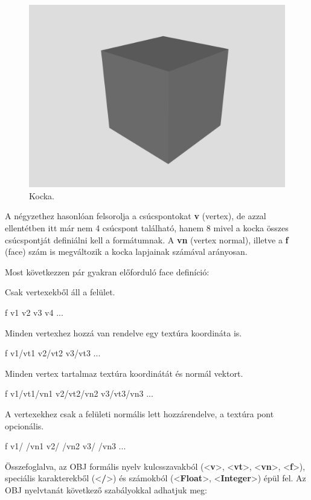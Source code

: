 \begin{figure}[h]
\centering
\includegraphics[scale=0.23]{images/cube_notexture.png}
\caption{Kocka.}
\end{figure}

A négyzethez hasonlóan felsorolja a csúcspontokat \textbf{v} (vertex), de azzal ellentétben itt már nem 4 csúcspont található, hanem 8 mivel a kocka összes csúcspontját definiálni kell a formátumnak. A \textbf{vn} (vertex normal), illetve a \textbf{f} (face) szám is megváltozik a kocka lapjainak számával arányosan.\newline


\noindent Most következzen pár gyakran előforduló face definíció:\newline

\noindent Csak vertexekből áll a felület.
\begin{cpp} 
f v1 v2 v3 v4 ...
\end{cpp}
Minden vertexhez hozzá van rendelve egy textúra koordináta is.
\begin{cpp} 
f v1/vt1 v2/vt2 v3/vt3 ...
\end{cpp}
Minden vertex tartalmaz textúra koordinátát és normál vektort.
\begin{cpp} 
f v1/vt1/vn1 v2/vt2/vn2 v3/vt3/vn3 ...
\end{cpp}
A vertexekhez csak a felületi normális lett hozzárendelve, a textúra pont opcionális.
\begin{cpp} 
f v1/ /vn1 v2/ /vn2 v3/ /vn3 ...
\end{cpp}
Összefoglalva, az OBJ formális nyelv kulcsszavakból (<\textbf{v}>, <\textbf{vt}>, <\textbf{vn}>, <\textbf{f}>), speciális karakterekből (<\textbf{/}>) és számokból (<\textbf{Float}>, <\textbf{Integer}>) épül fel. Az OBJ nyelvtanát következő szabályokkal adhatjuk meg:\\

